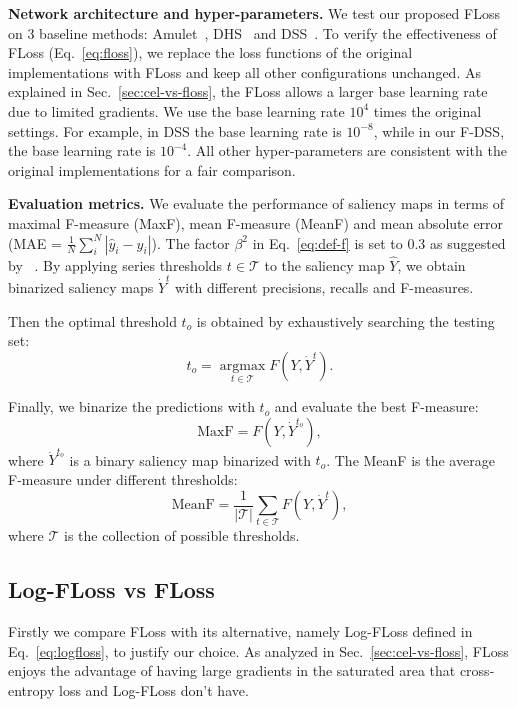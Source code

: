 \documentclass[10pt,twocolumn,letterpaper]{article}
\newcommand{\argmax}{\mathop{\mathrm{argmax}}\limits}
\begin{document}
\textbf{Network architecture and hyper-parameters.}
We test our proposed FLoss on 3 baseline methods:
Amulet~\cite{zhang2017amulet}, DHS~\cite{liu2011learning} and DSS~\cite{hou2017deeply}.
%
To verify the effectiveness of FLoss (Eq.~\ref{eq:floss}),
we replace the loss functions 
of the original implementations with FLoss
and keep all other configurations unchanged.
%
As explained in Sec.~\ref{sec:cel-vs-floss}, the FLoss allows a larger base learning rate due to
limited gradients.
%
We use the base learning rate $10^4$ times the original settings.
%
For example, in DSS the base learning rate is $10^{-8}$, while in our F-DSS, the base learning
rate is $10^{-4}$.
%
All other hyper-parameters are consistent with the original implementations for a fair comparison.

\textbf{Evaluation metrics.} We evaluate the performance of saliency maps
in terms of maximal F-measure (MaxF), mean F-measure (MeanF) and mean absolute error
(MAE = $\frac{1}{N}\sum_i^N |\hat{y}_i - y_i|$).
%
The factor $\beta^2$ in Eq.~\ref{eq:def-f} is set to 0.3 as suggested by
~\cite{achanta2009frequency, hou2017deeply, li2016deep,  liu2016dhsnet, wang2016saliency}.
%
By applying series thresholds $t\in \mathcal{T}$ to the saliency map $\hat{Y}$, we obtain
binarized saliency maps $\dot{Y}^t$ with different precisions, recalls and F-measures.

Then the optimal threshold $t_o$ is obtained by exhaustively searching the testing set:
\begin{equation}
t_o = \argmax_{t\in \mathcal{T}} F(Y, \dot{Y}^t).
\label{eq:optimal-t}
\end{equation}

Finally, we binarize the predictions with $t_o$ and evaluate the best F-measure:
\begin{equation}
  \text{MaxF} = F(Y, \dot{Y}^{t_o}),
  \label{eq:maxf}
\end{equation}
where $\dot{Y}^{t_o}$ is a binary saliency map binarized with $t_o$.
%
The MeanF is the average F-measure under different thresholds:
\begin{equation}
\text{MeanF} = \frac{1}{|\mathcal{T}|}\sum_{t\in \mathcal{T}} F(Y, \dot{Y}^t),
\label{eq:meanf}
\end{equation}
where $\mathcal{T}$ is the collection of possible thresholds.


\subsection{Log-FLoss vs FLoss}
Firstly we compare FLoss with its alternative, namely Log-FLoss defined in Eq.~\ref{eq:logfloss},
to justify our choice.
%
As analyzed in Sec.~\ref{sec:cel-vs-floss}, FLoss enjoys the advantage of having large gradients
in the saturated area that cross-entropy loss and Log-FLoss don't have.
\end{document}
